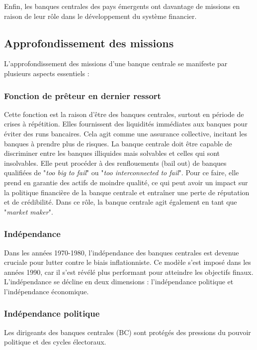 \documentclass[a4paper, 12pt]{report}
\begin{document}
Enfin, les banques centrales des pays émergents ont davantage de missions en raison de leur rôle dans le développement du système financier.

\subsection{Approfondissement des missions}

L'approfondissement des missions d'une banque centrale se manifeste par plusieurs aspects essentiels :

\subsubsection{Fonction de prêteur en dernier ressort} 

Cette fonction est la raison d'être des banques centrales, surtout en période de crises à répétition. Elles fournissent des liquidités immédiates aux banques pour éviter des runs bancaires. Cela agit comme une assurance collective, incitant les banques à prendre plus de risques. La banque centrale doit être capable de discriminer entre les banques illiquides mais solvables et celles qui sont insolvables. Elle peut procéder à des renflouements (bail out) de banques qualifiées de "\textit{too big to fail}" ou "\textit{too interconnected to fail}". Pour ce faire, elle prend en garantie des actifs de moindre qualité, ce qui peut avoir un impact sur la politique financière de la banque centrale et entraîner une perte de réputation et de crédibilité. Dans ce rôle, la banque centrale agit également en tant que "\textit{market maker}".

\subsubsection{Indépendance}

Dans les années 1970-1980, l'indépendance des banques centrales est devenue cruciale pour lutter contre le biais inflationniste. Ce modèle s'est imposé dans les années 1990, car il s'est révélé plus performant pour atteindre les objectifs finaux. L'indépendance se décline en deux dimensions : l'indépendance politique et l'indépendance économique.

\subsubsection{Indépendance politique}

Les dirigeants des banques centrales (BC) sont protégés des pressions du pouvoir politique et des cycles électoraux. 
\end{document}
